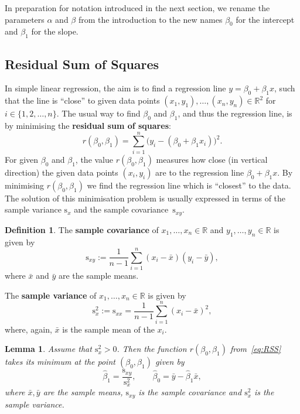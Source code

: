 \documentclass[
  a4paper,
]{article}
\newtheorem{lemma}{Lemma}[section]
\theoremstyle{definition}
\newtheorem{definition}{Definition}[section]
\theoremstyle{definition}
\theoremstyle{definition}
\theoremstyle{definition}
\theoremstyle{remark}
\begin{document}
In preparation for notation introduced in the next section, we rename the
parameters \(\alpha\) and \(\beta\) from the introduction to the new names
\(\beta_0\) for the intercept and \(\beta_1\) for the slope.

\subsection{Residual Sum of Squares}\label{residual-sum-of-squares}

In simple linear regression, the aim is to find a regression line \(y =
\beta_0 + \beta_1 x\), such that the line is ``close'' to given data points
\((x_1, y_1), \ldots, (x_n, y_n) \in\mathbb{R}^2\) for \(i \in \{1, 2, \ldots,
n\}\). The usual way to find \(\beta_0\) and \(\beta_1\), and thus the regression
line, is by minimising the \textbf{residual sum of squares}:
\begin{equation}
  r(\beta_0, \beta_1)
  = \sum_{i=1}^n \bigl( y_i - (\beta_0 + \beta_1 x_i) \bigr)^2.
  \label{eq:RSS}
\end{equation}
For given \(\beta_0\) and \(\beta_1\), the value \(r(\beta_0, \beta_1)\) measures
how close (in vertical direction) the given data points \((x_i, y_i)\)
are to the regression line \(\beta_0 + \beta_1 x\). By minimising
\(r(\beta_0, \beta_1)\) we find the regression line which is ``closest'' to
the data. The solution of this minimisation problem is usually
expressed in terms of the sample variance \(\mathrm{s}_x\) and the
sample covariance~\(\mathrm{s}_{xy}\).

\begin{definition}
\protect\hypertarget{def:sx}{}\label{def:sx}The \textbf{sample covariance} of \(x_1, \ldots, x_n \in \mathbb{R}\) and
\(y_1, \ldots, y_n\in\mathbb{R}\) is given by
\begin{equation*}
    \mathrm{s}_{xy}
    := \frac{1}{n-1} \sum_{i=1}^n (x_i - \bar x) (y_i - \bar y),
  \end{equation*}
where \(\bar x\) and \(\bar y\) are the sample means.

The \textbf{sample variance} of \(x_1, \ldots, x_n \in \mathbb{R}\) is given by
\begin{equation*}
    \mathrm{s}_{x}^2
    := \mathrm{s}_{xx}
    = \frac{1}{n-1} \sum_{i=1}^n (x_i - \bar x)^2,
  \end{equation*}
where, again, \(\bar x\) is the sample mean of the \(x_i\).
\end{definition}

\begin{lemma}
\protect\hypertarget{lem:simple-LSQ}{}\label{lem:simple-LSQ}Assume that \(\mathrm{s}_x^2 > 0\). Then the function \(r(\beta_0, \beta_1)\)
from~\eqref{eq:RSS} takes its minimum at the point \((\beta_0, \beta_1)\)
given by
\begin{equation*}
    \hat\beta_1 = \frac{\mathrm{s}_{xy}}{\mathrm{s}_x^2},
    \qquad
    \hat\beta_0 = \bar y - \hat \beta_1 \bar x,
  \end{equation*}
where \(\bar x, \bar y\) are the sample means, \(\mathrm{s}_{xy}\) is the
sample covariance and \(\mathrm{s}_x^2\) is the sample variance.
\end{lemma}
\end{document}
